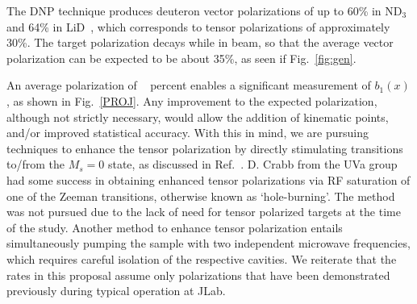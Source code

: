 
The DNP technique produces  deuteron vector polarizations of up to 60\%  in ND$_3$ 
and 64\% in LiD~\cite{Bueltmann:1998wq}, which corresponds to tensor polarizations of approximately 30\%.
The target polarization decays while in beam, so that the average vector polarization can be
expected to be about 35\%, as seen if Fig.~\ref{fig:gen}.



An average polarization of \PZ~ percent enables a significant measurement of $b_1(x)$, as shown in 
Fig.~\ref{PROJ}.  Any improvement to the expected polarization, although not strictly necessary, 
would allow the addition of kinematic points, and/or improved statistical accuracy.
With this in mind, we are pursuing techniques to enhance the tensor polarization by directly stimulating 
transitions to/from the $M_s=0$ state, as discussed in Ref.~\cite{Meyer:1985dta}.  D. Crabb from the UVa group  
had some success in obtaining enhanced tensor polarizations via RF saturation of one of the Zeeman transitions, otherwise known as `hole-burning'.  The method was not pursued due to the
lack of need for tensor polarized targets at the time of the study.  Another method to enhance tensor polarization entails simultaneously pumping the sample with two independent microwave frequencies, 
which requires careful isolation of the respective cavities. We reiterate that the rates in this proposal assume only polarizations that have been demonstrated previously during typical operation at JLab.



